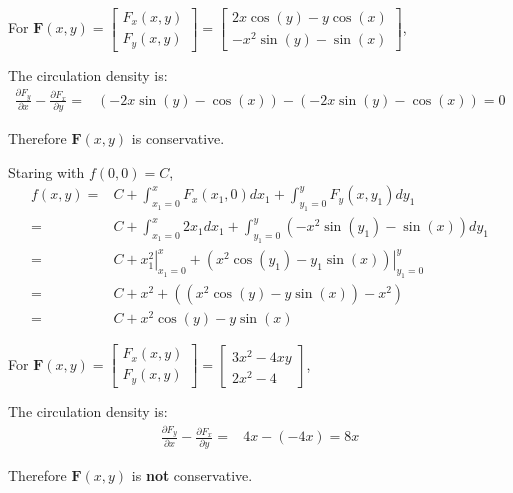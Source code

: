 \documentclass{article}
\newcommand{\colxyvec}[2]{\begin{bmatrix} #1 \\ #2 \end{bmatrix}}
\newcommand{\at}[1]{\left. #1 \right|}
\newcommand{\dr}[1]{\textcolor{dark_red}{#1}}
\begin{document}
\begin{framed}
\dr{For \(\mathbf{F}(x,y) = \colxyvec{F_x(x,y)}{F_y(x,y)} = \colxyvec{2x\cos(y) - y\cos(x)}{-x^2\sin(y) - \sin(x)}\),}

\dr{The circulation density is: 
\begin{align*}
\frac{\partial F_y}{\partial x} - \frac{\partial F_x}{\partial y} = & (-2x\sin(y) - \cos(x)) - (-2x\sin(y) - \cos(x)) = 0
\end{align*}}

\dr{Therefore \(\mathbf{F}(x,y)\) is conservative.}

\dr{Staring with \(f(0,0) = C\),
\begin{align*}
f(x,y) = & C + \int_{x_1 = 0}^x F_x(x_1,0)dx_1 + \int_{y_1 = 0}^y F_y(x,y_1)dy_1 \\
= & C + \int_{x_1 = 0}^x 2x_1dx_1 + \int_{y_1 = 0}^y (-x^2\sin(y_1) - \sin(x))dy_1 \\
= & C + \at{x_1^2}_{x_1 = 0}^x + \at{(x^2\cos(y_1) - y_1\sin(x))}_{y_1 = 0}^y \\
= & C + x^2 + ((x^2\cos(y) - y\sin(x)) - x^2) \\
= & C + x^2\cos(y) - y\sin(x)
\end{align*}}

\end{framed}

\pagebreak

\begin{framed}
\dr{For \(\mathbf{F}(x,y) = \colxyvec{F_x(x,y)}{F_y(x,y)} = \colxyvec{3x^2 - 4xy}{2x^2 - 4}\),}

\dr{The circulation density is: 
\begin{align*}
\frac{\partial F_y}{\partial x} - \frac{\partial F_x}{\partial y} = & 4x - (-4x) = 8x
\end{align*}}

\dr{Therefore \(\mathbf{F}(x,y)\) is {\bf not} conservative.}

\end{framed}
\end{document}
